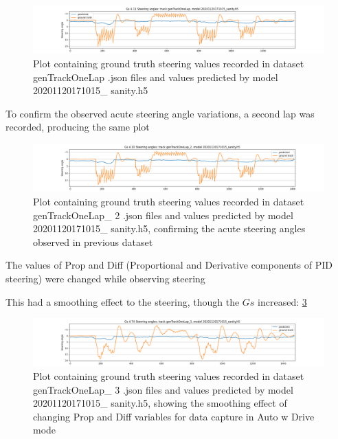 \begin{figure}[ht]
 \centering 
 \includegraphics[width=\textwidth]{Figures/sa_genTrackOneLap_20201120171015_sanity.h5.png}
 \caption{Plot containing ground truth steering values recorded in dataset genTrackOneLap .json files and values predicted by model 20201120171015\_ sanity.h5}
 \label{fig:genTrackOneLap_20201120171015_sanity_gos} 
\end{figure}

To confirm the observed acute steering angle variations, a second lap was recorded, producing the same plot
 \label{fig:a_genTrackOneLap_2_20201120171015_sanity} 

\begin{figure}[ht]
 \centering 
 \includegraphics[width=\textwidth]{Figures/sa_genTrackOneLap_2_20201120171015_sanity.h5.png}
 \caption{Plot containing ground truth steering values recorded in dataset genTrackOneLap\_ 2 .json files and values predicted by model 20201120171015\_ sanity.h5, confirming the acute steering angles observed in previous dataset}
 \label{fig:a_genTrackOneLap_2_20201120171015_sanity} 
\end{figure}

The values of Prop and Diff (Proportional and Derivative components of PID steering) were changed while observing steering 

This had a smoothing effect to the steering, though the $Gs$ increased:
 \ref{fig:genTrackOneLap_3_20201120171015_sanity_gos} 
 
\begin{figure}[ht]
 \centering 
 \includegraphics[width=\textwidth]{Figures/sa_genTrackOneLap_3_20201120171015_sanity.h5.png}
 \caption{Plot containing ground truth steering values recorded in dataset genTrackOneLap\_ 3 .json files and values predicted by model 20201120171015\_ sanity.h5, showing the smoothing effect of changing Prop and Diff variables for data capture in Auto w Drive mode}
 \label{fig:genTrackOneLap_3_20201120171015_sanity_gos} 
\end{figure}

